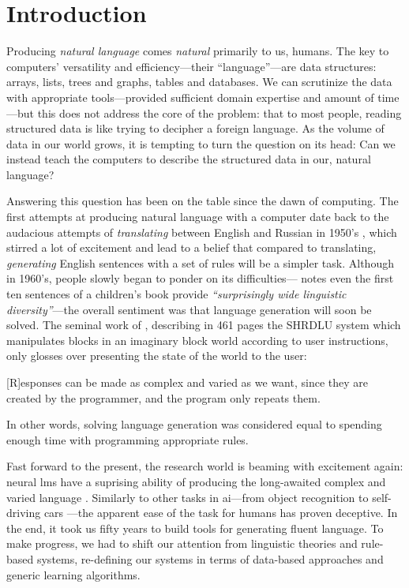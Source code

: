 \chapter{Introduction}
\label{chap:intro}
Producing \emph{natural language} comes \emph{natural} primarily to us, humans.
The key to computers' versatility and efficiency---their ``language''---are data structures: arrays, lists, trees and graphs, tables and databases.
We can scrutinize the data with appropriate tools---provided sufficient domain expertise and amount of time---but this does not address the core of the problem: that to most people, reading structured data is like trying to decipher a foreign language. As the volume of data in our world grows, it is tempting to turn the question on its head: Can we instead teach the computers to describe the structured data in our, natural language?


Answering this question has been on the table since the dawn of computing. The first attempts at producing natural language with a computer date back to the audacious attempts of \emph{translating} between English and Russian in 1950's \cite{sheridan1955research}, which stirred a lot of excitement and lead to a belief that compared to translating, \emph{generating} English sentences with a set of rules will be a simpler task. Although in 1960's, people slowly began to ponder on its difficulties---\citet{yngve1961random} notes even the first ten sentences of a children's book provide \emph{``surprisingly wide linguistic diversity''}---the overall sentiment was that language generation will soon be solved. The seminal work of \citet{winograd1971procedures}, describing in 461 pages the SHRDLU system which manipulates blocks in an imaginary block world according to user instructions, only glosses over presenting the state of the world to the user:
\begin{pquotation}{\citealp[p.384]{winograd1971procedures}}
    [R]esponses can be made as complex and varied as we want, since they are created by the programmer, and the program only repeats them.
\end{pquotation}
In other words, solving language generation was considered equal to spending enough time with programming appropriate rules.

Fast forward to the present, the research world is beaming with excitement again: neural \acp{lm} have a suprising ability of producing the long-awaited complex and varied language \cite{radford2019language,brown2020language}. Similarly to other tasks in \ac{ai}---from object recognition \cite{papert1966summer} to self-driving cars \cite{autonomouscars}---the apparent ease of the task for humans has proven deceptive. In the end, it took us fifty years to build tools for generating fluent language. To make progress, we had to shift our attention from linguistic theories and rule-based systems, re-defining our systems in terms of data-based approaches and generic learning algorithms.

